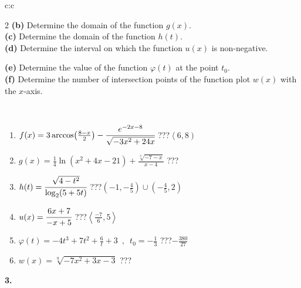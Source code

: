 \documentclass[10pt]{report}
\begin{document}
\begin{tabular}{c:c}
\begin{minipage}[c][104.5mm][t]{0.5\linewidth}
\begin{center}
\begin{minipage}{0.95\linewidth}
\begin{center}
{\begin{multicols}{2}
\textbf{(b)} Determine the domain of the function \(g(x)\). \\[1mm]
\textbf{(c)} Determine the domain of the function \(h(t)\). \\[1mm]
\textbf{(d)} Determine the interval on which the function \(u(x)\) is non-negative. \par \columnbreak
\textbf{(e)} Determine the value of the function \(\varphi(t)\) at the point \(t_0\). \\[1mm]
\textbf{(f)} Determine the number of intersection points of the function plot \(w(x)\) with the \(x\)-axis. \\[1mm]
\end{multicols}
}
\end{center}
\end{minipage}
\\[4mm]
\begin{minipage}{0.79\linewidth}
\begin{center}
\begin{varwidth}{\linewidth}
\begin{enumerate}
\small
\item $f(x) = 3\arccos\!\left( \frac{8-x}{2} \right) - \cfrac{e^{-2x-8}}{\sqrt{-3x^2+24x}}$\quad \dotfill\; ???\;\dotfill \quad $\left\langle6 , 8\right)$
\item $g(x) = \frac{1}{4} \ln{\!(x^2+4x-21)}+\frac{\sqrt[3]{-7-x}}{x-4}$\quad \dotfill\; ???\;\dotfill {}
\item $h(t) = \cfrac{\sqrt{4-t^2}}{\log_2(5+5t)}$\quad \dotfill\; ???\;\dotfill \quad $\left(-1 , -\frac{4}{5}\right)\cup\left(-\frac{4}{5} , 2\right)$
\item $u(x) = \cfrac{6x+7}{-x+5}$\quad \dotfill\; ???\;\dotfill \quad $\left\langle\frac{-7}{6} , 5\right\rangle$
\item $\varphi(t) = -4t^3+7t^2+\frac{6}{t}+3 \enspace , \enspace t_0=-\frac{1}{3}$\quad \dotfill\; ???\;\dotfill \quad $-\frac{380}{27}$
\item $w(x) = \sqrt[9]{-7x^2+3x-3}$\quad \dotfill\; ???\;\dotfill {}
\end{enumerate}
\end{varwidth}
\end{center}
\end{minipage}
\begin{minipage}{0.20\linewidth}
\begin{center}
{\Huge\bfseries 3.} \\[2mm]

\end{center}
\end{minipage}
\end{center}
\end{minipage}
\end{tabular}
\end{document}
